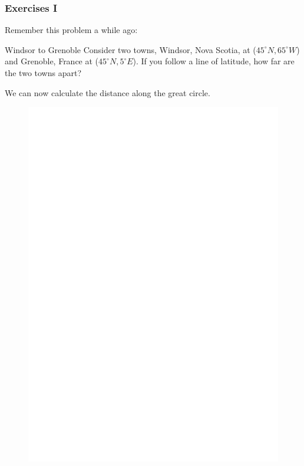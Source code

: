 \documentclass[xcolor=dvipsnames]{beamer}
\begin{document}
\begin{frame}
  \frametitle{Exercises I}
Remember this problem a while ago: 

\begin{block}{Windsor to Grenoble}
  Consider two towns, Windsor, Nova Scotia, at
  ($45^{\circ}N,65^{\circ}W$) and Grenoble, France at
  ($45^{\circ}N,5^{\circ}E$). If you follow a line of latitude, how
  far are the two towns apart?
\end{block}

We can now calculate the distance along the great circle.

\begin{figure}[h]
\includegraphics[scale=.3]{./WindsorGrenoble2.eps}
\end{figure}
\end{frame}
\end{document}
